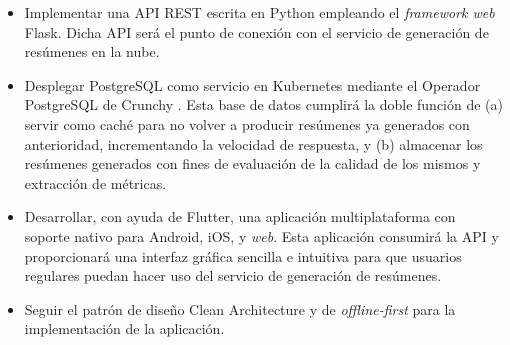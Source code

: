 \begin{itemize}
	\item [\textbullet] Implementar una API REST escrita en Python empleando el \emph{framework web} Flask. Dicha API será el punto de conexión con el servicio de generación de resúmenes en la nube.
	
	\item [\textbullet] Desplegar PostgreSQL como servicio en Kubernetes mediante el Operador PostgreSQL de Crunchy \cite{crunchy21}. Esta base de datos cumplirá la doble función de (a) servir como caché para no volver a producir resúmenes ya generados con anterioridad, incrementando la velocidad de respuesta, y (b) almacenar los resúmenes generados con fines de evaluación de la calidad de los mismos y extracción de métricas.
	
	\item [\textbullet] Desarrollar, con ayuda de Flutter, una aplicación multiplataforma con soporte nativo para Android, iOS, y \emph{web}. Esta aplicación consumirá la API y proporcionará una interfaz gráfica sencilla e intuitiva para que usuarios regulares puedan hacer uso del servicio de generación de resúmenes.
	
	\item [\textbullet] Seguir el patrón de diseño Clean Architecture \cite{martin15} y de \emph{offline-first} \cite{sauble15} para la implementación de la aplicación.
\end{itemize}